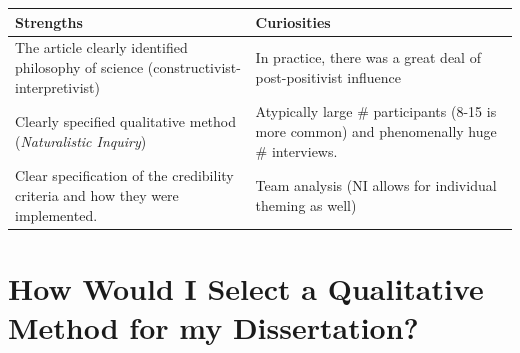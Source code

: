 \documentclass[
  english,
]{book}
\begin{document}
\begin{longtable}[]{@{}ll@{}}
\toprule
\begin{minipage}[b]{0.48\columnwidth}\raggedright
Strengths\strut
\end{minipage} & \begin{minipage}[b]{0.46\columnwidth}\raggedright
Curiosities\strut
\end{minipage}\tabularnewline
\midrule
\endhead
\begin{minipage}[t]{0.48\columnwidth}\raggedright
The article clearly identified philosophy of science (constructivist-interpretivist)\strut
\end{minipage} & \begin{minipage}[t]{0.46\columnwidth}\raggedright
In practice, there was a great deal of post-positivist influence\strut
\end{minipage}\tabularnewline
\begin{minipage}[t]{0.48\columnwidth}\raggedright
Clearly specified qualitative method (\emph{Naturalistic Inquiry})\strut
\end{minipage} & \begin{minipage}[t]{0.46\columnwidth}\raggedright
Atypically large \# participants (8-15 is more common) and phenomenally huge \# interviews.\strut
\end{minipage}\tabularnewline
\begin{minipage}[t]{0.48\columnwidth}\raggedright
Clear specification of the credibility criteria and how they were implemented.\strut
\end{minipage} & \begin{minipage}[t]{0.46\columnwidth}\raggedright
Team analysis (NI allows for individual theming as well)\strut
\end{minipage}\tabularnewline
\bottomrule
\end{longtable}

\hypertarget{how-would-i-select-a-qualitative-method-for-my-dissertation}{%
\section{How Would I Select a Qualitative Method for my Dissertation?}\label{how-would-i-select-a-qualitative-method-for-my-dissertation}}
\end{document}
